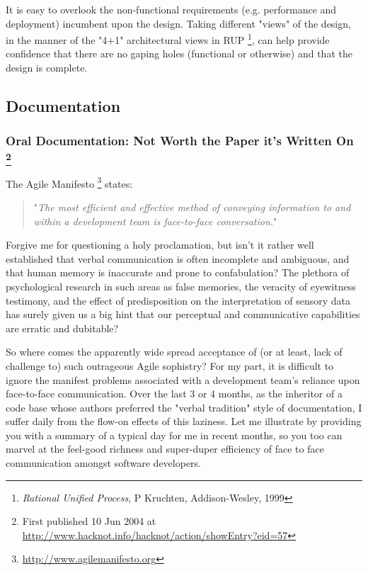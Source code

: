 \documentclass{article}
\begin{document}
\begin{enumerate}
It is easy to overlook the non-functional requirements (e.g. performance
and deployment) incumbent upon the design. Taking different "views" of
the design, in the manner of the "4+1" architectural views in RUP \footnote{\emph{Rational Unified Process}, P Kruchten, Addison-Wesley, 1999},
can help provide confidence that there are no gaping holes (functional
or otherwise) and that the design is complete.
\end{enumerate}

\subsection{Documentation}
\label{sec:orgheadline256}

\subsubsection{Oral Documentation: Not Worth the Paper it's Written On \footnote{First published 10 Jun 2004 at
\url{http://www.hacknot.info/hacknot/action/showEntry?eid=57}}}
\label{sec:orgheadline249}

The Agile Manifesto \footnote{\url{http://www.agilemanifesto.org}} states:

\begin{quote}
"\emph{The most efficient and effective method of conveying information to
and within a development team is face-to-face conversation.}"
\end{quote}

Forgive me for questioning a holy proclamation, but isn't it rather well
established that verbal communication is often incomplete and ambiguous,
and that human memory is inaccurate and prone to confabulation? The
plethora of psychological research in such areas as false memories, the
veracity of eyewitness testimony, and the effect of predisposition on
the interpretation of sensory data has surely given us a big hint that
our perceptual and communicative capabilities are erratic and dubitable?

So where comes the apparently wide spread acceptance of (or at least,
lack of challenge to) such outrageous Agile sophistry? For my part, it
is difficult to ignore the manifest problems associated with a
development team's reliance upon face-to-face communication. Over the
last 3 or 4 months, as the inheritor of a code base whose authors
preferred the "verbal tradition" style of documentation, I suffer daily
from the flow-on effects of this laziness. Let me illustrate by
providing you with a summary of a typical day for me in recent months,
so you too can marvel at the feel-good richness and super-duper
efficiency of face to face communication amongst software developers.
\end{document}
